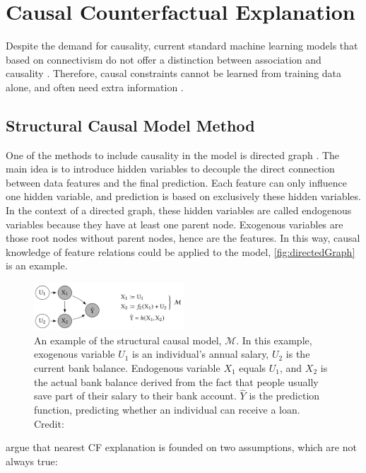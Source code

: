 \section{Causal Counterfactual Explanation}\label{sec:Causality}
Despite the demand for causality, current standard machine learning models that based on connectivism do not offer a distinction between association and causality \cite{diffThatMakesDiff}. Therefore, causal constraints cannot be learned from training data alone, and often need extra information \cite{bookCausality,preservingCausal}.
\subsection{Structural Causal Model Method}
One of the methods to include causality in the model is directed graph \cite{algorithmicrecourse}. The main idea is to introduce hidden variables to decouple the direct connection between data features and the final prediction. Each feature can only influence one hidden variable, and prediction is based on exclusively these hidden variables. In the context of a directed graph, these hidden variables are called endogenous variables because they have at least one parent node. Exogenous variables are those root nodes without parent nodes, hence are the features. In this way, causal knowledge of feature relations could be applied to the model, \autoref{fig:directedGraph} is an example.
\begin{figure}
  \centering
  \includegraphics[width=0.5\textwidth]{directedGraph.PNG}
  \caption{An example of the structural causal model, $\mathcal{M}$. In this example, exogenous variable $U_1$ is an individual's annual salary, $U_2$ is the current bank balance. Endogenous variable $X_1$ equals $U_1$, and $X_2$ is the actual bank balance derived from the fact that people usually save part of their salary to their bank account. $\hat Y$ is the prediction function, predicting whether an individual can receive a loan. Credit:\cite{algorithmicrecourse}}
  \label{fig:directedGraph}
\end{figure}

\citeauthor{algorithmicrecourse} \cite{algorithmicrecourse} argue that nearest CF explanation is founded on two assumptions, which are not always true:

